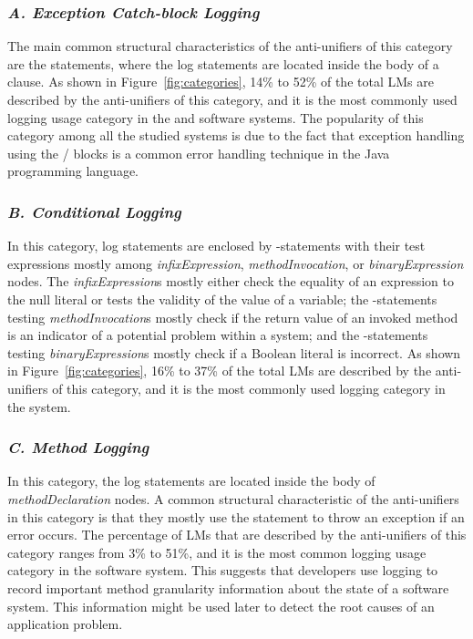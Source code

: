 
\subsubsection{\emph{A. Exception Catch-block Logging}}  \label{Exception catch-block logging}
The main common structural characteristics of the anti-unifiers of this category are the  statements, where the log statements are located inside the body of a  clause. As shown in Figure~\ref{fig:categories}, 14\% to 52\% of the total LMs are described by the anti-unifiers of this category, and it is the most commonly used logging usage category in the  and  software systems. The popularity of this category among all the studied systems is due to the fact that exception handling using the / blocks is a common error handling technique in the Java programming language.


\subsubsection{\emph{B. Conditional Logging}}  \label{conditional logging}
In this category, log statements are enclosed by -statements with their test expressions mostly among \textit{infixExpression}, \textit{methodInvocation}, or \textit{binaryExpression} nodes. The \textit{infixExpression}s mostly either check the equality of an expression to the null literal or tests the validity of the value of a variable; the -statements testing \textit{methodInvocation}s mostly check if the return value of an invoked method is an indicator of a potential problem within a system; and the -statements testing \textit{binaryExpression}s mostly check if a Boolean literal is incorrect. As shown in Figure~\ref{fig:categories}, 16\% to 37\% of the total LMs are described by the anti-unifiers of this category, and it is the most commonly used logging category in the  system.

\subsubsection{\emph{C. Method Logging}}  \label{method logging}
In this category, the log statements are located inside the body of \textit{methodDeclaration} nodes. A common structural characteristic of the anti-unifiers in this category is that they mostly use the  statement to throw an exception if an error occurs. The percentage of LMs that are described by the anti-unifiers of this category ranges from 3\% to 51\%, and it is the most common logging usage category in the  software system. This suggests that developers use logging to record important method granularity information about the state of a software system. This information might be used later to detect the root causes of an application problem.



